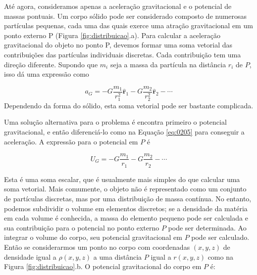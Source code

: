\documentclass[]{book}
\theoremstyle{definition}
\theoremstyle{definition}
\theoremstyle{definition}
\theoremstyle{remark}
\begin{document}
Até agora, consideramos apenas a aceleração gravitacional e o potencial de massas pontuais. Um corpo sólido pode ser considerado composto de numerosas partículas pequenas, cada uma das quais exerce uma atração gravitacional em um ponto externo P (Figura \ref{fig:distribuicao}.a). Para calcular a aceleração gravitacional do objeto no ponto P, devemos formar uma soma vetorial das contribuições das partículas individuais discretas. Cada contribuição tem uma direção diferente. Supondo que \(m_i\) seja a massa da partícula na distância \(r_i\) de \(P\), isso dá uma expressão como

\begin{equation}
a_G = -G\frac{m_1}{r_1^2}\hat{\mathbf{r}}_1 -G\frac{m_2}{r_2^2}\hat{\mathbf{r}}_2 - \cdots \label{eq:0211}
\end{equation}
Dependendo da forma do sólido, esta soma vetorial pode ser bastante complicada.

Uma solução alternativa para o problema é encontra primeiro o potencial gravitacional, e então diferenciá-lo como na Equação \eqref{eq:0205} para conseguir a aceleração. A expressão para o potencial em \(P\) é

\begin{equation}
U_G = -G\frac{m_1}{r_1} -G\frac{m_2}{r_2} - \cdots \label{eq:0212}
\end{equation}

Esta é uma soma escalar, que é usualmente mais simples do que calcular uma soma vetorial.
Mais comumente, o objeto não é representado como um conjunto de partículas discretas, mas por uma distribuição de massa contínua. No entanto, podemos subdividir o volume em elementos discretos; se a densidade da matéria em cada volume é conhecida, a massa do elemento pequeno pode ser calculada e sua contribuição para o potencial no ponto externo \(P\) pode ser determinada. Ao integrar o volume do corpo, seu potencial gravitacional em \(P\) pode ser calculado. Então se considerarmos um ponto no corpo com coordenadas \((x, y, z)\) de densidade igual a \(\rho(x, y, z)\) a uma distância \(P\) igual a \(r(x,y,z)\) como na Figura \ref{fig:distribuicao}.b. O potencial gravitacional do corpo em \(P\) é:
\end{document}
